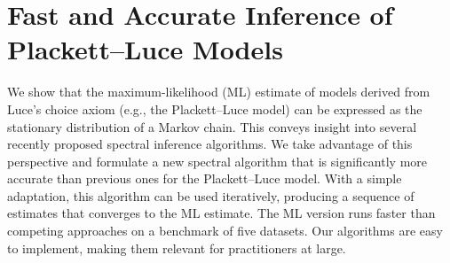 \chapter{Fast and Accurate Inference of Plackett--Luce Models}
\label{ch:fastinference}

We show that the maximum-likelihood (ML) estimate of models derived from Luce's choice axiom (e.g., the Plackett--Luce model) can be expressed as the stationary distribution of a Markov chain.
This conveys insight into several recently proposed spectral inference algorithms.
We take advantage of this perspective and formulate a new spectral algorithm that is significantly more accurate than previous ones for the Plackett--Luce model.
With a simple adaptation, this algorithm can be used iteratively, producing a sequence of estimates that converges to the ML estimate.
The ML version runs faster than competing approaches on a benchmark of five datasets.
Our algorithms are easy to implement, making them relevant for practitioners at large.









